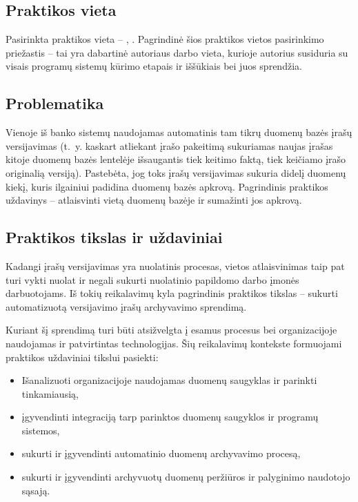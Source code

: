 
\subsection*{Praktikos vieta}
Pasirinkta praktikos vieta -- \SEB, \PDT. Pagrindinė šios praktikos vietos pasirinkimo priežastis -- tai yra dabartinė autoriaus darbo vieta, kurioje autorius susiduria su visais programų sistemų kūrimo etapais ir iššūkiais bei juos sprendžia. 

\subsection*{Problematika}
Vienoje iš banko sistemų naudojamas automatinis tam tikrų duomenų bazės įrašų versijavimas (t.~y. kaskart atliekant įrašo pakeitimą sukuriamas naujas įrašas kitoje duomenų bazės lentelėje išsaugantis tiek keitimo faktą, tiek keičiamo įrašo originalią versiją). Pastebėta, jog toks įrašų versijavimas sukuria didelį duomenų kiekį, kuris ilgainiui padidina duomenų bazės apkrovą. Pagrindinis praktikos uždavinys -- atlaisvinti vietą duomenų bazėje ir sumažinti jos apkrovą.

\subsection*{Praktikos tikslas ir uždaviniai}
Kadangi įrašų versijavimas yra nuolatinis procesas, vietos atlaisvinimas taip pat turi vykti nuolat ir negali sukurti nuolatinio papildomo darbo įmonės darbuotojams. Iš tokių reikalavimų kyla pagrindinis praktikos tikslas -- sukurti automatizuotą versijavimo įrašų archyvavimo sprendimą.

Kuriant šį sprendimą turi būti atsižvelgta į esamus procesus bei organizacijoje naudojamas ir patvirtintas technologijas. Šių reikalavimų kontekste formuojami praktikos uždaviniai tikslui pasiekti:
\begin{itemize}
    \item Išanalizuoti organizacijoje naudojamas duomenų saugyklas ir parinkti tinkamiausią,
    \item įgyvendinti integraciją tarp parinktos duomenų saugyklos ir programų sistemos,
    \item sukurti ir įgyvendinti automatinio duomenų archyvavimo procesą,
    \item sukurti ir įgyvendinti archyvuotų duomenų peržiūros ir palyginimo naudotojo sąsają.
\end{itemize}   

